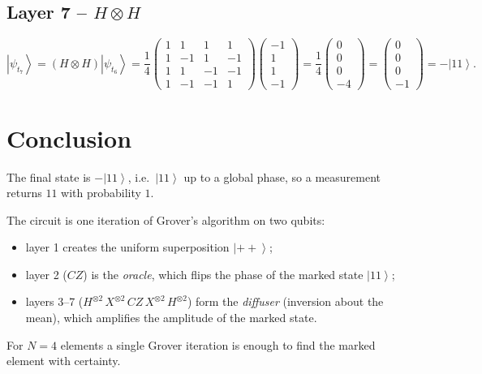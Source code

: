 \documentclass[11pt,a4paper]{article}
\newcommand{\ket}[1]{\left|#1\right\rangle}
\newcommand{\psit}[1]{\ket{\psi_{t_{#1}}}}
\newcommand{\HH}{\begin{pmatrix} 1 & 1 & 1 & 1\\ 1 & -1 & 1 & -1\\ 1 & 1 & -1 & -1\\ 1 & -1 & -1 & 1 \end{pmatrix}}
\begin{document}
\subsection*{Layer 7 -- $H\otimes H$}
\[
\psit{7} = (H\otimes H)\psit{6} = \frac14\HH\begin{pmatrix}-1\\1\\1\\-1\end{pmatrix}
= \frac14\begin{pmatrix}0\\0\\0\\-4\end{pmatrix}
= \begin{pmatrix}0\\0\\0\\-1\end{pmatrix} = -\ket{11}.
\]

\section*{Conclusion}
The final state is $-\ket{11}$, i.e.\ $\ket{11}$ up to a global phase, so a measurement
returns $11$ with probability $1$.

The circuit is one iteration of Grover's algorithm on two qubits:
\begin{itemize}
  \item layer 1 creates the uniform superposition $\ket{++}$;
  \item layer 2 ($CZ$) is the \emph{oracle}, which flips the phase of the marked state $\ket{11}$;
  \item layers 3--7 ($H^{\otimes2}\,X^{\otimes2}\,CZ\,X^{\otimes2}\,H^{\otimes2}$) form the
        \emph{diffuser} (inversion about the mean), which amplifies the amplitude of the marked state.
\end{itemize}
For $N=4$ elements a single Grover iteration is enough to find the marked element with certainty.
\end{document}
